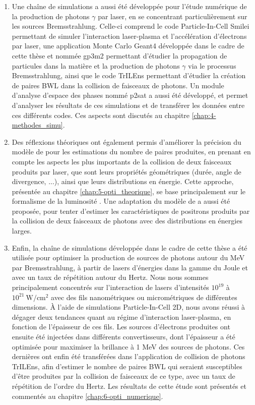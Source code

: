 \begin{refsection}
\begin{enumerate}
    \item Une chaîne de simulations a aussi été développée pour l'étude numérique de la production de photons $\gamma$ par laser, en se concentrant particulièrement sur les sources Bremsstrahlung. Celle-ci comprend le code Particle-In-Cell Smilei \parencite{derouillat_2018} permettant de simuler l'interaction laser-plasma et l'accélération d'électrons par laser, une application Monte Carlo Geant4 \parencite{agostinelli_2003} développée dans le cadre de cette thèse et nommée gp3m2 \parencite{gp3m2} permettant d'étudier la propagation de particules dans la matière et la production de photons $\gamma$ via le processus Bremsstrahlung, ainsi que le code TrILEns \parencite{jansen_2018} permettant d'étudier la création de paires BWL dans la collision de faisceaux de photons. Un module d'analyse d'espace des phases nommé p2sat \parencite{p2sat} a aussi été développé, et permet d'analyser les résultats de ces simulations et de transférer les données entre ces différents codes. Ces aspects sont discutés au chapitre \ref{chap:4-methodes_simu}.
    
    \item Des réflexions théoriques ont également permis d'améliorer la précision du modèle de \cite{ribeyre_2016} pour les estimations du nombre de paires produites, en prenant en compte les aspects les plus importants de la collision de deux faisceaux produits par laser, que sont leurs propriétés géométriques (durée, angle de divergence, ...), ainsi que leurs distributions en énergie. Cette approche, présentée au chapitre \ref{chap:5-opti_theorique}, se base principalement sur le formalisme de la luminosité \parencite{herr_2006}. Une adaptation du modèle de \cite{ribeyre_2017} a aussi été proposée, pour tenter d'estimer les caractéristiques de positrons produits par la collision de deux faisceaux de photons avec des distributions en énergies larges.
    
    \item Enfin, la chaîne de simulations développée dans le cadre de cette thèse a été utilisée pour optimiser la production de sources de photons autour du MeV par Bremsstrahlung, à partir de lasers d'énergies dans la gamme du Joule et avec un taux de répétition autour du Hertz. Nous nous sommes principalement concentrés sur l'interaction de lasers d'intensités $10^{19}$ à $10^{21} ~ \si{\W\per\cm^2}$ avec des fils nanométriques ou micrométriques de différentes dimensions. À l'aide de simulations Particle-In-Cell 2D, nous avons réussi à dégager deux tendances quant au régime d'interaction laser-plasma, en fonction de l'épaisseur de ces fils. Les sources d'électrons produites ont ensuite été injectées dans différents convertisseurs, dont l'épaisseur a été optimisée pour maximiser la brillance à 1 MeV des sources de photons. Ces dernières ont enfin été transférées dans l'application de collision de photons TrILEns, afin d'estimer le nombre de paires BWL qui seraient susceptibles d'être produites par la collision de faisceaux de ce type, avec un taux de répétition de l'ordre du Hertz. Les résultats de cette étude sont présentés et commentés au chapitre \ref{chap:6-opti_numerique}.
\end{enumerate}


\end{refsection}
